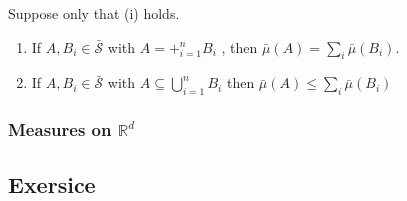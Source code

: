 \documentclass[../main.tex]{subfiles}
\begin{document}
\begin{lemma}{}{}
    Suppose only that (i) holds. 
    \begin{enumerate}
        \item If \(  A,B_{i} \in \bar{\mathcal{S}}  \)  with \(  A= + _{i= 1}^{n}B_{i}  \) , then \(  \bar{\mu}\left( A \right)= \sum _{i} \bar{\mu}\left( B_{i} \right)    \). 
        \item If \(  A,B_{i} \in \bar{\mathcal{S}}  \)    with \(  A\subseteq \bigcup _{i = 1}^{n} B_{i}  \) then \(  \bar{\mu}\left( A \right)\le \sum _{i} \bar{\mu}\left( B_{i} \right)    \)  
    \end{enumerate}
    
\end{lemma}

\subsubsection{Measures on \(  \mathbb{R} ^{d}  \) }

\subsection{Exersice}
\end{document}
